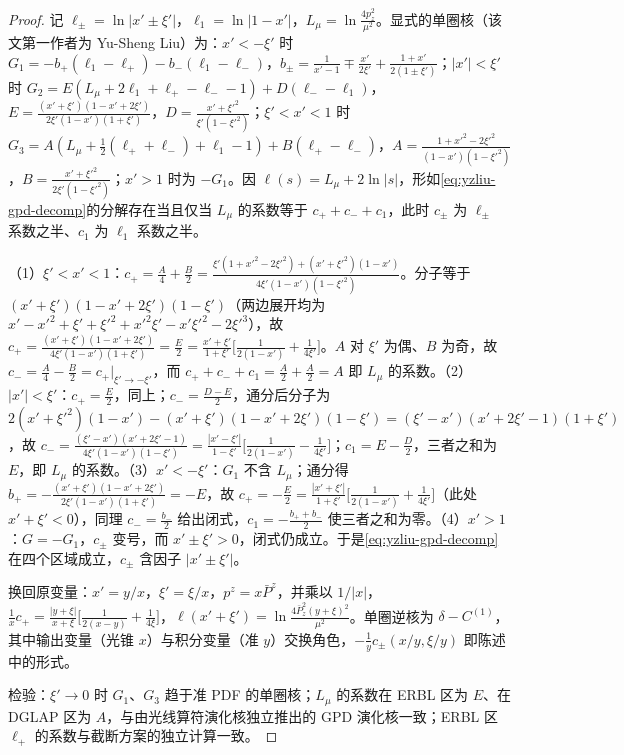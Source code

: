 \begin{proof}
记 $\ell_\pm=\ln|x'\pm\xi'|$，$\ell_1=\ln|1-x'|$，$L_\mu=\ln\frac{4p_z^2}{\mu^2}$。显式的单圈核\cite[式~(39)--(43)、(46)]{Liu:2019urm}（该文第一作者为 Yu-Sheng Liu）为：$x'<-\xi'$ 时 $G_1=-b_+(\ell_1-\ell_+)-b_-(\ell_1-\ell_-)$，$b_\pm=\frac1{x'-1}\mp\frac{x'}{2\xi'}+\frac{1+x'}{2(1\pm\xi')}$；$|x'|<\xi'$ 时 $G_2=E(L_\mu+2\ell_1+\ell_+-\ell_--1)+D(\ell_--\ell_1)$，$E=\frac{(x'+\xi')(1-x'+2\xi')}{2\xi'(1-x')(1+\xi')}$，$D=\frac{x'+\xi'^2}{\xi'(1-\xi'^2)}$；$\xi'<x'<1$ 时 $G_3=A(L_\mu+\frac12(\ell_++\ell_-)+\ell_1-1)+B(\ell_+-\ell_-)$，$A=\frac{1+x'^2-2\xi'^2}{(1-x')(1-\xi'^2)}$，$B=\frac{x'+\xi'^2}{2\xi'(1-\xi'^2)}$；$x'>1$ 时为 $-G_1$。因 $\ell(s)=L_\mu+2\ln|s|$，形如\cref{eq:yzliu-gpd-decomp}的分解存在当且仅当 $L_\mu$ 的系数等于 $c_++c_-+c_1$，此时 $c_\pm$ 为 $\ell_\pm$ 系数之半、$c_1$ 为 $\ell_1$ 系数之半。

（1）$\xi'<x'<1$：$c_+=\frac A4+\frac B2=\frac{\xi'(1+x'^2-2\xi'^2)+(x'+\xi'^2)(1-x')}{4\xi'(1-x')(1-\xi'^2)}$。分子等于 $(x'+\xi')(1-x'+2\xi')(1-\xi')$（两边展开均为 $x'-x'^2+\xi'+\xi'^2+x'^2\xi'-x'\xi'^2-2\xi'^3$），故 $c_+=\frac{(x'+\xi')(1-x'+2\xi')}{4\xi'(1-x')(1+\xi')}=\frac E2=\frac{x'+\xi'}{1+\xi'}\big[\frac1{2(1-x')}+\frac1{4\xi'}\big]$。$A$ 对 $\xi'$ 为偶、$B$ 为奇，故 $c_-=\frac A4-\frac B2=c_+|_{\xi'\to-\xi'}$，而 $c_++c_-+c_1=\frac A2+\frac A2=A$ 即 $L_\mu$ 的系数。（2）$|x'|<\xi'$：$c_+=\frac E2$，同上；$c_-=\frac{D-E}2$，通分后分子为 $2(x'+\xi'^2)(1-x')-(x'+\xi')(1-x'+2\xi')(1-\xi')=(\xi'-x')(x'+2\xi'-1)(1+\xi')$，故 $c_-=\frac{(\xi'-x')(x'+2\xi'-1)}{4\xi'(1-x')(1-\xi')}=\frac{|x'-\xi'|}{1-\xi'}\big[\frac1{2(1-x')}-\frac1{4\xi'}\big]$；$c_1=E-\frac D2$，三者之和为 $E$，即 $L_\mu$ 的系数。（3）$x'<-\xi'$：$G_1$ 不含 $L_\mu$；通分得 $b_+=-\frac{(x'+\xi')(1-x'+2\xi')}{2\xi'(1-x')(1+\xi')}=-E$，故 $c_+=-\frac E2=\frac{|x'+\xi'|}{1+\xi'}\big[\frac1{2(1-x')}+\frac1{4\xi'}\big]$（此处 $x'+\xi'<0$），同理 $c_-=\frac{b_-}2$ 给出闭式，$c_1=-\frac{b_++b_-}2$ 使三者之和为零。（4）$x'>1$：$G=-G_1$，$c_\pm$ 变号，而 $x'\pm\xi'>0$，闭式仍成立。于是\cref{eq:yzliu-gpd-decomp}在四个区域成立，$c_\pm$ 含因子 $|x'\pm\xi'|$。

换回原变量：$x'=y/x$，$\xi'=\xi/x$，$p^z=x\bar P^z$，并乘以 $1/|x|$，$\frac1x c_+=\frac{|y+\xi|}{x+\xi}\big[\frac1{2(x-y)}+\frac1{4\xi}\big]$，$\ell(x'+\xi')=\ln\frac{4\bar P_z^2(y+\xi)^2}{\mu^2}$。单圈逆核为 $\delta-C^{(1)}$，其中输出变量（光锥 $x$）与积分变量（准 $y$）交换角色，$-\frac1y c_\pm(x/y,\xi/y)$ 即陈述中的形式。

检验：$\xi'\to0$ 时 $G_1$、$G_3$ 趋于准 PDF 的单圈核；$L_\mu$ 的系数在 ERBL 区为 $E$、在 DGLAP 区为 $A$，与由光线算符演化核独立推出的 GPD 演化核一致；ERBL 区 $\ell_+$ 的系数与截断方案的独立计算\cite{Ji:2015qla}一致。
\end{proof}
